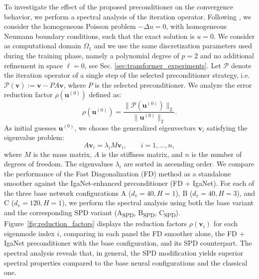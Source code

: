 \documentclass{article}
\newcommand{\Dlat}{d_v} %
\newcommand{\reflevel}{\ell} %
\theoremstyle{plain}
\numberwithin{equation}{section}
\begin{document}
To investigate the effect of the proposed preconditioner on the convergence behavior, we perform a spectral analysis of the iteration operator.
Following \cite{tielen2020pmultigrid}, we consider the homogeneous Poisson problem $-\Delta u = 0$, with homogeneous Neumann boundary conditions, such that the exact solution is $u=0$. We consider as computational domain  $\Omega_1$ and we use the same discretization parameters used during the training phase, namely a polynomial degree of $p=2$ and no additional refinement in space $\reflevel=0$, see Sec. \ref{sec:transformer_experiments}.
Let $\mathcal{P}$ denote the iteration operator of a single step of the selected preconditioner strategy, i.e. $\mathcal{P}(\mathbf{v}):=\mathbf{v}-PA\mathbf{v}$, where $P$ is the selected preconditioner. We analyze the error reduction factor $\rho(\mathbf{u}^{(0)})$ defined as:
\begin{equation*}
    \rho(\mathbf{u}^{(0)}) = \frac{\| \mathcal{P}(\mathbf{u}^{(0)}) \|_{2}}{\| \mathbf{u}^{(0)} \|_{2}}.
\end{equation*}
As initial guesses $\mathbf{u}^{(0)}$, we choose the generalized eigenvectors $\mathbf{v}_i$ satisfying the eigenvalue problem:
\begin{equation*}
    A \mathbf{v}_i = \lambda_i M \mathbf{v}_i, \qquad i=1, \ldots, n,
\end{equation*}
where $M$ is the mass matrix, $A$ is the stiffness matrix, and $n$ is the number of degrees of freedom. The eigenvalues $\lambda_i$ are sorted in ascending order.
We compare the performance of the Fast Diagonalization (FD) method as a standalone smoother against the IgaNet-enhanced preconditioner (FD + IgaNet). For each of the three base network configurations A ($\Dlat=40, H=1$), B ($\Dlat=40, H=3$), and C ($\Dlat=120, H=1$), we perform the spectral analysis using both the base variant and the corresponding SPD variant (A\textsubscript{SPD}, B\textsubscript{SPD}, C\textsubscript{SPD}).
Figure~\ref{fig:reduction_factors} displays the reduction factors $\rho(\mathbf{v}_i)$ for each eigenmode index $i$, comparing in each panel the FD smoother alone, the FD + IgaNet preconditioner with the base configuration, and its SPD counterpart.
The spectral analysis reveals that, in general, the SPD modification yields superior spectral properties compared to the base neural configurations and the classical one.
\end{document}
